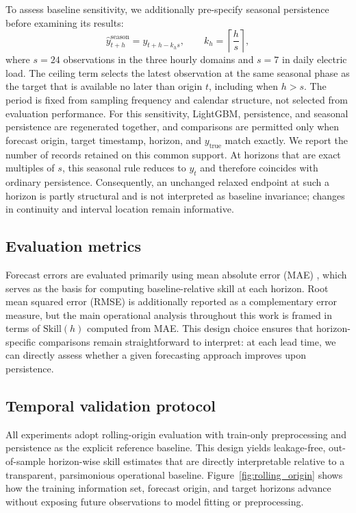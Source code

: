 \documentclass[pdflatex]{sn-jnl}
\begin{document}
To assess baseline sensitivity, we additionally pre-specify seasonal
persistence before examining its results:
\begin{equation}
  \hat y^{\mathrm{season}}_{t+h}=y_{t+h-k_hs},
  \qquad k_h=\left\lceil\frac{h}{s}\right\rceil,
\end{equation}
where $s=24$ observations in the three hourly domains and $s=7$ in daily
electric load. The ceiling term selects the latest observation at the same
seasonal phase as the target that is available no later than origin $t$,
including when $h>s$. The period is fixed from sampling frequency and calendar
structure, not selected from evaluation performance. For this sensitivity,
LightGBM, persistence, and seasonal persistence are regenerated together, and
comparisons are permitted only when forecast origin, target timestamp, horizon,
and $y_{\mathrm{true}}$ match exactly. We report the number of records retained
on this common support.
At horizons that are exact multiples of $s$, this seasonal rule reduces to
$y_t$ and therefore coincides with ordinary persistence. Consequently, an
unchanged relaxed endpoint at such a horizon is partly structural and is not
interpreted as baseline invariance; changes in continuity and interval location
remain informative.

\subsection{Evaluation metrics}

Forecast errors are evaluated primarily using mean absolute error (MAE) \citep{hyndman2006}, which serves as the basis for computing baseline-relative skill at each horizon. Root mean squared error (RMSE) is additionally reported as a complementary error measure, but the main operational analysis throughout this work is framed in terms of $\mathrm{Skill}(h)$ computed from MAE. This design choice ensures that horizon-specific comparisons remain straightforward to interpret: at each lead time, we can directly assess whether a given forecasting approach improves upon persistence.

\subsection{Temporal validation protocol}
All experiments adopt rolling-origin evaluation with train-only preprocessing and persistence as the explicit reference baseline. This design yields leakage-free, out-of-sample horizon-wise skill estimates that are directly interpretable relative to a transparent, parsimonious operational baseline.
Figure~\ref{fig:rolling_origin} shows how the training information set,
forecast origin, and target horizons advance without exposing future
observations to model fitting or preprocessing.
\end{document}
